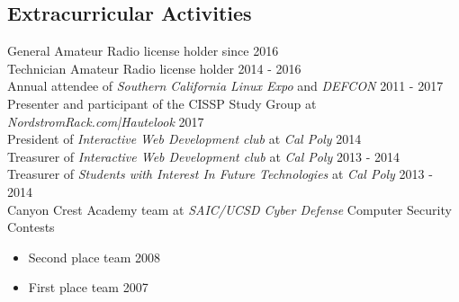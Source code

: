 \documentclass[line]{tex/res}
\begin{document}
\begin{resume}
\section{Extracurricular Activities}
    General Amateur Radio license holder since \hfill 2016 \\
    Technician Amateur Radio license holder \hfill 2014 - 2016 \\
    Annual attendee of {\it Southern California Linux Expo} and {\it DEFCON} \hfill 2011 - 2017 \\
    Presenter and participant of the CISSP Study Group at {\it NordstromRack.com|Hautelook} \hfill 2017 \\
    President of {\it Interactive Web Development club} at {\it Cal Poly} \hfill 2014 \\
    Treasurer of {\it Interactive Web Development club} at {\it Cal Poly} \hfill 2013 - 2014 \\
    Treasurer of {\it Students with Interest In Future Technologies} at {\it Cal Poly} \hfill 2013 - 2014 \\
    Canyon Crest Academy team at {\it SAIC/UCSD Cyber Defense} Computer Security Contests
    \begin{itemize} \itemsep -2pt
        \item Second place team \hfill 2008
        \item First place team \hfill 2007
    \end{itemize}

\end{resume}
\end{document}
